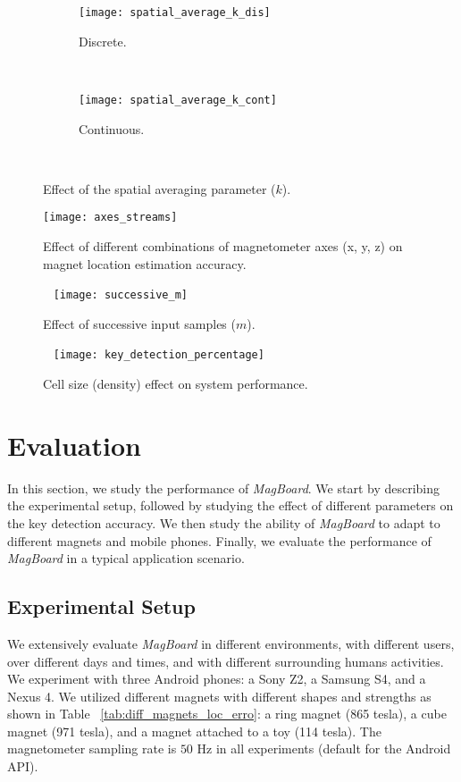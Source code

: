 \documentclass[conference]{IEEEtran}
\def \sys {\textit{MagBoard}}
\begin{document}
\begin{figure}[!t]
\centering
        \begin{subfigure}[t]{0.24\textwidth}
                \centering
                \texttt{[image: spatial\_average\_k\_dis]}
                \caption{Discrete.}
                \label{fig:k_discrete}
        \end{subfigure}~~
        \begin{subfigure}[t]{0.24\textwidth}
                \centering
                \texttt{[image: spatial\_average\_k\_cont]}
                \caption{Continuous.}
                \label{fig:k_continuous}
        \end{subfigure}~
\caption{Effect of the spatial averaging parameter ($k$).}
\label{fig:spatial_averaging_parameter}
\vspace{-0.2in}
\end{figure}

\begin{figure*}[!t]
 \texttt{[image: axes\_streams]}
 \caption{Effect of different combinations of magnetometer axes (x, y, z) on magnet location estimation accuracy.}
 \label{fig:axes_combinattions}
\endminipage\hfill~
  \texttt{[image: successive\_m]}
 \caption{Effect of successive input samples ($m$).} 
 \label{fig:successive_samples}
\endminipage\hfill~
\texttt{[image: key\_detection\_percentage]}
\caption{Cell size (density) effect on system performance.}
\label{fig:density}
\endminipage
\vspace{-0.1in}
\end{figure*}

\section{Evaluation}
\label{sec:evaluation}

In this section, we study the performance of \sys{}. We start by describing the experimental setup, followed by studying the effect of different parameters on the key detection accuracy. We then study the ability of \sys{} to adapt to different magnets and mobile phones. Finally, we evaluate the performance of \sys{} in a typical application scenario.

\subsection{Experimental Setup}
We extensively evaluate \sys{} in different environments, with different users, over different days and times, and with different surrounding humans activities. We experiment with three Android phones: a Sony Z2, a Samsung S4, and a Nexus 4. We utilized different magnets with different shapes and strengths as shown in Table ~\ref{tab:diff_magnets_loc_erro}: a ring magnet (865 tesla), a cube magnet (971 tesla), and a magnet attached to a toy (114 tesla). The magnetometer sampling rate is $50$ Hz in all experiments (default for the Android API). 
\end{document}
